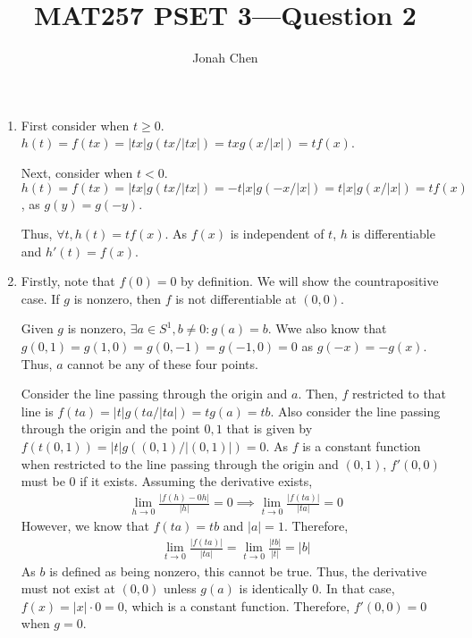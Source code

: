 \documentclass{exam}
\title{MAT257 PSET 3---Question 2}
\author{Jonah Chen}
\numberwithin{equation}{section}
\begin{document}
    \sffamily
    \maketitle
    \begin{enumerate}[label=(\alph*)]
        \item First consider when $t\geq 0$. $h(t)=f(tx)=|tx|g(tx/|tx|)=txg(x/|x|)=tf(x)$. 
        
        Next, consider when $t<0$. $h(t)=f(tx)=|tx|g(tx/|tx|)=-t|x|g(-x/|x|)=t|x|g(x/|x|)=tf(x)$, as $g(y)=g(-y)$.

        Thus, $\forall t, h(t)=tf(x)$. As $f(x)$ is independent of $t$, $h$ is differentiable and $h'(t)=f(x)$.
        \item Firstly, note that $f(0)=0$ by definition. We will show the countrapositive case. If $g$ is nonzero, then $f$ is not differentiable at $(0,0)$. 
        
        Given $g$ is nonzero, $\exists a\in S^1, b\neq 0:g(a)=b$. Wwe also know that $g(0,1)=g(1,0)=g(0,-1)=g(-1,0)=0$ as $g(-x)=-g(x)$. Thus, $a$ cannot be any of these four points. 

        Consider the line passing through the origin and $a$. Then, $f$ restricted to that line is $f(ta)=|t|g(ta/|ta|)=tg(a)=tb$. Also consider the line passing through the origin and the point $0,1$ that is given by $f(t(0,1))=|t|g((0,1)/|(0,1)|)=0$. As $f$ is a constant function when restricted to the line passing through the origin and $(0,1)$, $f'(0,0)$ must be 0 if it exists. Assuming the derivative exists,
        \begin{align*}
            \lim_{h\to 0}\frac{|f(h)-0h|}{|h|}=0\implies\lim_{t\to 0}\frac{|f(ta)|}{|ta|}=0
        \end{align*}
        However, we know that $f(ta)=tb$ and $|a|=1$. Therefore,
        \begin{align*}
            \lim_{t\to 0}\frac{|f(ta)|}{|ta|}=\lim_{t\to 0}\frac{|tb|}{|t|}=|b|
        \end{align*}
        As $b$ is defined as being nonzero, this cannot be true. Thus, the derivative must not exist at $(0,0)$ unless $g(a)$ is identically $0$. In that case, $f(x)=|x|\cdot 0=0$, which is a constant function. Therefore, $f'(0,0)=0$ when $g=0$.
    \end{enumerate}
\end{document}

